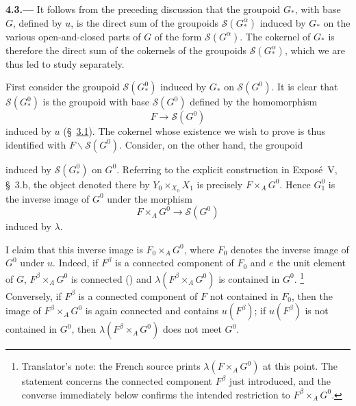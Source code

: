 
\medskip
{}\label{par:sga3-VIA-4.3}%
\noindent\textbf{4.3.---}
It follows from the preceding discussion that the groupoid \(G_*\),
with base \(G\), defined by \(u\), is the direct sum of the groupoids
\(\mathscr S(G^\alpha_*)\) induced by \(G_*\) on the various
open-and-closed parts of \(G\) of the form
\(\mathscr S(G^\alpha)\). The cokernel of \(G_*\) is therefore the
direct sum of the cokernels of the groupoids
\(\mathscr S(G^\alpha_*)\), which we are thus led to study
separately.

First consider the groupoid \(\mathscr S(G^0_*)\) induced by \(G_*\)
on \(\mathscr S(G^0)\). It is clear that
\(\mathscr S(G^0_*)\) is the groupoid with base
\(\mathscr S(G^0)\) defined by the homomorphism
\[
  F\longrightarrow\mathscr S(G^0)
\]
induced by \(u\) (\S~\hyperref[par:sga3-VIA-3.1]{3.1}). The cokernel whose existence we wish to
prove is thus identified with \(F\backslash\mathscr S(G^0)\).
Consider, on the other hand, the groupoid
\begin{center}
  \label{diag:sga3-VIA-4.3-G0-groupoid}%
\end{center}
induced by \(\mathscr S(G^0_*)\) on \(G^0\). Referring to the
explicit construction in Expos\'e~V, \S~3.b, the object denoted there
by \(Y_0\times_{X_0}X_1\) is precisely \(F\times_A G^0\). Hence
\(G^0_1\) is the inverse image of \(G^0\) under the morphism
\[
  F\times_A G^0\longrightarrow\mathscr S(G^0)
\]
induced by \(\lambda\).

I claim that this inverse image is \(F_0\times_A G^0\), where
\(F_0\) denotes the inverse image of \(G^0\) under \(u\). Indeed, if
\(F^\beta\) is a connected component of \(F_0\) and \(e\) the unit element of \(G\),
\(F^\beta\times_A G^0\) is connected () and
\(\lambda(F^\beta\times_A G^0)\) is contained in \(G^0\).%
\begingroup
\renewcommand{\thefootnote}{\fnsymbol{footnote}}%
\footnote[1]{Translator's note: the French source prints
\(\lambda(F\times_A G^0)\) at this point. The statement concerns the
connected component \(F^\beta\) just introduced, and the converse
immediately below confirms the intended restriction to
\(F^\beta\times_A G^0\).}%
\endgroup
Conversely, if \(F^\beta\) is a connected component of \(F\) not
contained in \(F_0\), then the image of
\(F^\beta\times_A G^0\) is again connected and contains
\(u(F^\beta)\); if \(u(F^\beta)\) is not contained in \(G^0\), then
\(\lambda(F^\beta\times_A G^0)\) does not meet \(G^0\).

